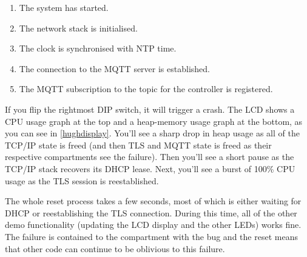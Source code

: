\begin{enumerate}
	\item{The system has started.}
	\item{The network stack is initialised.}
	\item{The clock is synchronised with NTP time.}
	\item{The connection to the MQTT server is established.}
	\item{The MQTT subscription to the topic for the controller is registered.}
\end{enumerate}

If you flip the rightmost DIP switch, it will trigger a crash.
The LCD shows a CPU usage graph at the top and a heap-memory usage graph at the bottom, as you can see in \ref{hughdisplay}.
You'll see a sharp drop in heap usage as all of the TCP/IP state is freed (and then TLS and MQTT state is freed as their respective compartments see the failure).
Then you'll see a short pause as the TCP/IP stack recovers its DHCP lease.
Next, you'll see a burst of 100\% CPU usage as the TLS session is reestablished.


The whole reset process takes a few seconds, most of which is either waiting for DHCP or reestablishing the TLS connection.
During this time, all of the other demo functionality (updating the LCD display and the other LEDs) works fine.
The failure is contained to the compartment with the bug and the reset means that other code can continue to be oblivious to this failure.
